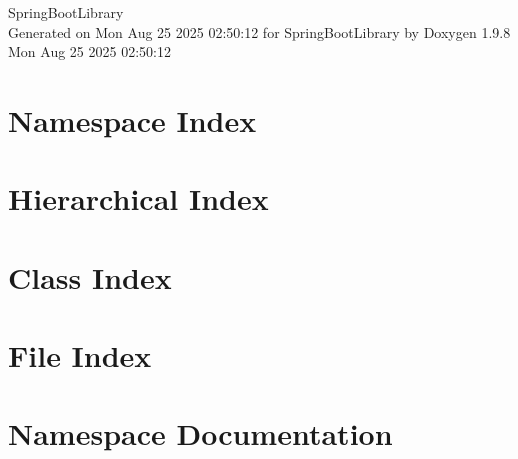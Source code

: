 \documentclass[twoside]{book}
\newcommand{\+}{\discretionary{\mbox{\scriptsize$\hookleftarrow$}}{}{}}
\newcommand{\clearemptydoublepage}{%
    \newpage{\pagestyle{empty}\cleardoublepage}%
  }
\begin{document}
  \raggedbottom
    \hypersetup{pageanchor=false,
                bookmarksnumbered=true,
                pdfencoding=unicode
               }
  \begin{titlepage}
  \vspace*{7cm}
  \begin{center}%
  {\Large Spring\+Boot\+Library}\\
  \vspace*{1cm}
  {\large Generated on Mon Aug 25 2025 02\+:50\+:12 for Spring\+Boot\+Library by Doxygen 1.9.8}\\
    \vspace*{0.5cm}
    {\small Mon Aug 25 2025 02:50:12}
  \end{center}
  \end{titlepage}
  \clearemptydoublepage
  \tableofcontents
  \clearemptydoublepage
  \hypersetup{pageanchor=true}

\chapter{Namespace Index}

\chapter{Hierarchical Index}

\chapter{Class Index}

\chapter{File Index}

\chapter{Namespace Documentation}









\end{document}
